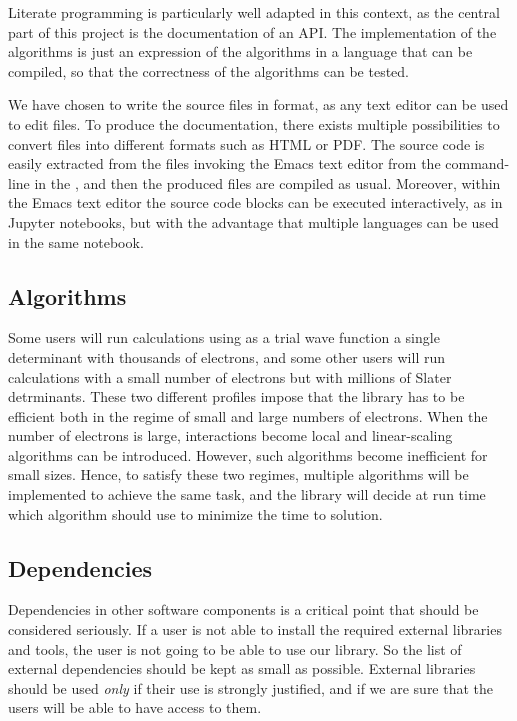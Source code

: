 Literate programming is particularly well adapted in this context, as
the central part of this project is the documentation of an
\ac{API}. The implementation of the algorithms is just an expression
of the algorithms in a language that can be compiled, so that the
correctness of the algorithms can be tested.

We have chosen to write the source files in {\orgmode}
format\cite{schulte_2012,orgmode}, as any text editor can be used to
edit {\orgmode} files. To produce the documentation, there exists
multiple possibilities to convert {\orgmode} files into different
formats such as \ac{HTML} or \ac{PDF}. The source code is easily
extracted from the {\orgmode} files invoking the Emacs text editor
from the command-line in the {\Makefile}, and then the produced files
are compiled as usual.  Moreover, within the Emacs text editor the
source code blocks can be executed interactively, as in Jupyter
notebooks\cite{Kluyver_2016}, but with the advantage that multiple
languages can be used in the same notebook.

\subsection{Algorithms}

Some users will run calculations using as a trial wave function a
single determinant with thousands of electrons, and some other users
will run calculations with a small number of electrons but with millions
of Slater detrminants. These two different profiles impose that the
library has to be efficient both in the regime of small and large numbers
of electrons. When the number of electrons is large, interactions
become local and linear-scaling algorithms can be introduced. However,
such algorithms become inefficient for small sizes.  Hence, to
satisfy these two regimes, multiple algorithms will be implemented to
achieve the same task, and the library will decide at run time which
algorithm should use to minimize the time to solution.


\subsection{Dependencies}

Dependencies in other software components is a critical point that
should be considered seriously. If a user is not able to install the
required external libraries and tools, the user is not going to be
able to use our library. So the list of external dependencies should
be kept as small as possible.  External libraries should be used
\emph{only} if their use is strongly justified, and if we are sure
that the users will be able to have access to them.

